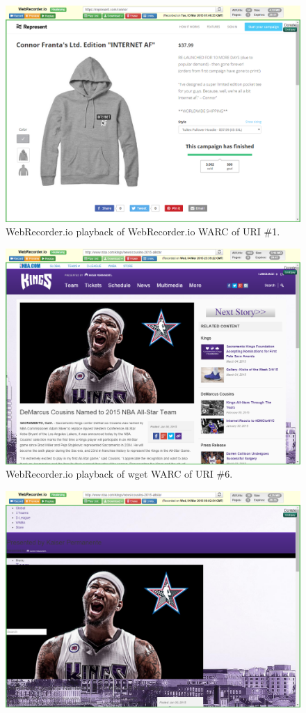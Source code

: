 \documentclass[a4paper,12pt]{article}
\begin{document}
\begin{appendices}
\begin{figure}[H]
    \includegraphics[scale=0.5]{images/1_webrecorder_in_webrecorder.png}
    \caption{WebRecorder.io playback of WebRecorder.io WARC of URI \#1.}
\end{figure}
\begin{figure}[H]
    \centering
    \includegraphics[scale=0.5]{images/6_wget_in_webrecorder.png}
    \caption{WebRecorder.io playback of wget WARC of URI \#6.}
\end{figure}
\begin{figure}[H]
    \centering
    \includegraphics[scale=0.5]{images/6_warcreate_in_webrecorder.png}

\end{figure}
\end{appendices}
\end{document}
